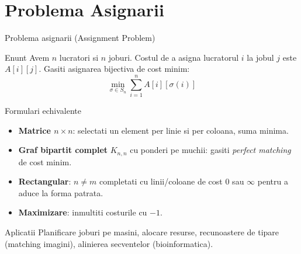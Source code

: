﻿\documentclass[9pt]{beamer}
\begin{document}
\section{Problema Asignarii}

\begin{frame}[shrink]{Problema asignarii (Assignment Problem)}
  \begin{block}{Enunt}
    Avem $n$ lucratori si $n$ joburi. Costul de a asigna lucratorul $i$ la jobul $j$
    este $A[i][j]$. Gasiti asignarea bijectiva de cost minim:
    \[
      \min_{\sigma \in S_n} \sum_{i=1}^{n} A[i][\sigma(i)]
    \]
  \end{block}
  \begin{block}{Formulari echivalente}
    \begin{itemize}\footnotesize\itemsep1pt
      \item \textbf{Matrice $n\times n$}: selectati un element per linie si per coloana,
            suma minima.
      \item \textbf{Graf bipartit complet} $K_{n,n}$ cu ponderi pe muchii:
            gasiti \textit{perfect matching} de cost minim.
      \item \textbf{Rectangular}: $n\neq m$ \textemdash{} completati cu linii/coloane de cost 0
            sau $\infty$ pentru a aduce la forma patrata.
      \item \textbf{Maximizare}: inmultiti costurile cu $-1$.
    \end{itemize}
  \end{block}
  \begin{alertblock}{Aplicatii}
    \footnotesize
    Planificare joburi pe masini, alocare resurse, recunoastere de tipare (matching imagini),
    alinierea secventelor (bioinformatica).
  \end{alertblock}
\end{frame}
\end{document}
